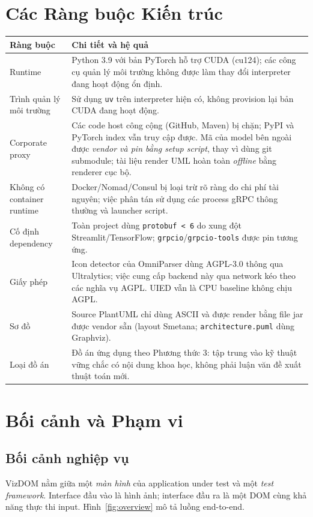 \documentclass[11pt,a4paper]{report}
\newcommand{\code}[1]{\texttt{#1}}
\begin{document}
\chapter{Các Ràng buộc Kiến trúc}
\begin{longtable}{@{}p{3.6cm}p{11.0cm}@{}}
\toprule
\textbf{Ràng buộc} & \textbf{Chi tiết và hệ quả} \\
\midrule
\endhead
Runtime & Python 3.9 với bản PyTorch hỗ trợ CUDA (cu124); các công cụ quản lý môi trường không được làm thay đổi interpreter đang hoạt động ổn định. \\
Trình quản lý môi trường & Sử dụng \code{uv} trên interpreter hiện có, không provision lại bản CUDA đang hoạt động. \\
Corporate proxy & Các code host công cộng (GitHub, Maven) bị chặn; PyPI và PyTorch index vẫn truy cập được. Mã của model bên ngoài được \emph{vendor và pin bằng setup script}, thay vì dùng git submodule; tài liệu render UML hoàn toàn \emph{offline} bằng renderer cục bộ. \\
Không có container runtime & Docker/Nomad/Consul bị loại trừ rõ ràng do chi phí tài nguyên; việc phân tán sử dụng các process gRPC thông thường và launcher script. \\
Cố định dependency & Toàn project dùng \code{protobuf < 6} do xung đột Streamlit/TensorFlow; \code{grpcio}/\code{grpcio-tools} được pin tương ứng. \\
Giấy phép & Icon detector của OmniParser dùng AGPL-3.0 thông qua Ultralytics; việc cung cấp backend này qua network kéo theo các nghĩa vụ AGPL. UIED vẫn là CPU baseline không chịu AGPL. \\
Sơ đồ & Source PlantUML chỉ dùng ASCII và được render bằng file jar được vendor sẵn (layout Smetana; \code{architecture.puml} dùng Graphviz). \\
Loại đồ án & Đồ án ứng dụng theo Phương thức 3: tập trung vào kỹ thuật vững chắc có nội dung khoa học, không phải luận văn đề xuất thuật toán mới. \\
\bottomrule
\end{longtable}

\chapter{Bối cảnh và Phạm vi}
\section{Bối cảnh nghiệp vụ}
VizDOM nằm giữa một \emph{màn hình} của application under test và một \emph{test
framework}. Interface đầu vào là hình ảnh; interface đầu ra là một DOM cùng khả năng
thực thi input. Hình~\ref{fig:overview} mô tả luồng end-to-end.
\end{document}
